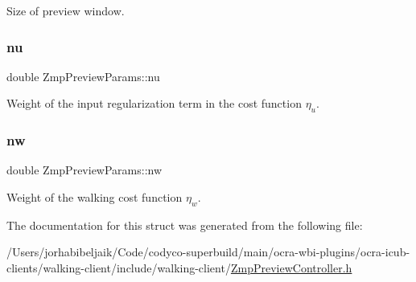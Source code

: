 Size of preview window. \hypertarget{structZmpPreviewParams_a3be5d92df5593e2a7c5694beaf912dac}{}\label{structZmpPreviewParams_a3be5d92df5593e2a7c5694beaf912dac} 
\subsubsection{\texorpdfstring{nu}{nu}}
{\footnotesize\ttfamily double Zmp\+Preview\+Params\+::nu}

Weight of the input regularization term in the cost function $\eta_u$. \hypertarget{structZmpPreviewParams_ae09ca5b74feda7b0af99c07cd7a36c64}{}\label{structZmpPreviewParams_ae09ca5b74feda7b0af99c07cd7a36c64} 
\subsubsection{\texorpdfstring{nw}{nw}}
{\footnotesize\ttfamily double Zmp\+Preview\+Params\+::nw}

Weight of the walking cost function $ \eta_w $. 

The documentation for this struct was generated from the following file\+:\begin{DoxyCompactItemize}
\item 
/\+Users/jorhabibeljaik/\+Code/codyco-\/superbuild/main/ocra-\/wbi-\/plugins/ocra-\/icub-\/clients/walking-\/client/include/walking-\/client/\hyperlink{ZmpPreviewController_8h}{Zmp\+Preview\+Controller.\+h}\end{DoxyCompactItemize}
